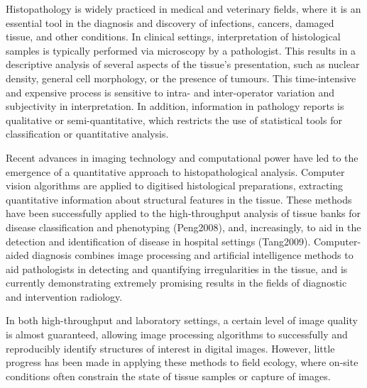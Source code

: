 \documentclass[10pt]{article}
\begin{document}
Histopathology is widely practiced in medical and veterinary fields, where it is an essential tool in the diagnosis and discovery of infections, cancers, damaged tissue, and other conditions. In clinical settings, interpretation of histological samples is typically performed via microscopy by a pathologist. This results in a descriptive analysis of several aspects of the tissue's presentation, such as nuclear density, general cell morphology, or the presence of tumours. This time-intensive and expensive process is sensitive to intra- and inter-operator variation and subjectivity in interpretation. In addition, information in pathology reports is qualitative or semi-quantitative, which restricts the use of statistical tools for classification or quantitative analysis.

Recent advances in imaging technology and computational power have led to the emergence of a quantitative approach to histopathological analysis. Computer vision algorithms are applied to digitised histological preparations, extracting quantitative information about structural features in the tissue. These methods have been successfully applied to the high-throughput analysis of tissue banks for disease classification and phenotyping (Peng2008), and, increasingly, to aid in the detection and identification of disease in hospital settings (Tang2009). Computer-aided diagnosis combines image processing and artificial intelligence methods to aid pathologists in detecting and quantifying irregularities in the tissue, and is currently demonstrating extremely promising results in the fields of diagnostic and intervention radiology. 

In both high-throughput and laboratory settings, a certain level of image quality is almost guaranteed, allowing image processing algorithms to successfully and reproducibly identify structures of interest in digital images. However, little progress has been made in applying these methods to field ecology, where on-site conditions often constrain the state of tissue samples or capture of images. 
\end{document}
